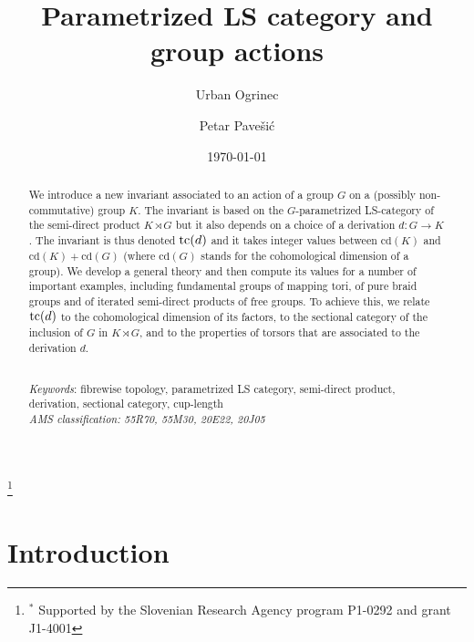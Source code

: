 \documentclass[11pt]{amsart}
\theoremstyle{plain}
\theoremstyle{definition}
\newcommand{\tc}{\mathop{\rm tc}\nolimits}
\newcommand{\cd}{\mathrm{cd}}
\begin{document}
\title{Parametrized LS category and group actions}
\author{Urban Ogrinec \and Petar Pavešić}

\address{{Urban Ogrinec,
Institute for Mathematics, Physics and Mechanics, Ljubljana, Slovenia; 
Faculty of Mathematics and Physics, University of Ljubljana, Ljubljana, Slovenia}}

\address{{Petar Pavešić,
Institute for Mathematics, Physics and Mechanics, Ljubljana, Slovenia; 
Faculty of Mathematics and Physics, University of Ljubljana, Ljubljana, Slovenia}}

\thanks{$^{*}$ Supported by the Slovenian Research Agency program P1-0292 and grant J1-4001}

\date{\today}

\begin{abstract}
We introduce a new invariant associated to an action of a group $G$ on a (possibly non-commutative)
group $K$. The invariant is based on the $G$-parametrized LS-category of the semi-direct product
$K\rtimes G$ but it also depends on a choice of a derivation $d\colon G\to K$. 
The invariant is thus denoted $\tc(d)$ and it takes integer values between 
$\cd(K)$ and $\cd(K)+\cd(G)$ (where $\cd(G)$ stands for the cohomological dimension of a group). We develop 
a general theory and then compute its values for a number of important examples, including 
fundamental groups of mapping tori, of pure braid groups and of iterated semi-direct 
products of free groups. To achieve this, we relate $\tc(d)$ to the cohomological dimension
of its factors, to the sectional category of the inclusion of $G$ in $K\rtimes G$, and to 
the properties of torsors that are associated to the derivation $d$.


\ \\[3mm]
{\it Keywords}: fibrewise topology, parametrized LS category, semi-direct product, derivation, sectional category,
cup-length\\
{\it AMS classification: 55R70, 55M30, 20E22, 20J05} 
\end{abstract}

\maketitle



\section{Introduction}\label{sec:Introduction}
\end{document}
